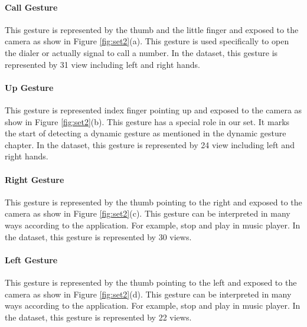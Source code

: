 \paragraph{Call Gesture}
This gesture is represented by the thumb and the little finger and exposed to the camera as show in Figure \ref{fig:set2}(a). This gesture is used specifically to open the dialer or actually signal to call a number. In the dataset, this gesture is represented by 31 view including left and right hands.

\paragraph{Up Gesture}
This gesture is represented index finger pointing up and exposed to the camera as show in Figure \ref{fig:set2}(b). This gesture has a special role in our set. It marks the start of detecting a dynamic gesture as mentioned in the dynamic gesture chapter. In the dataset, this gesture is represented by 24 view including left and right hands. 

\paragraph{Right Gesture}
This gesture is represented by the thumb pointing to the right and exposed to the camera as show in Figure \ref{fig:set2}(c). This gesture can be interpreted in many ways according to the application. For example, stop and play in music player. In the dataset, this gesture is represented by 30 views. 

\paragraph{Left Gesture}
This gesture is represented by the thumb pointing to the left and exposed to the camera as show in Figure \ref{fig:set2}(d). This gesture can be interpreted in many ways according to the application. For example, stop and play in music player. In the dataset, this gesture is represented by 22 views.

